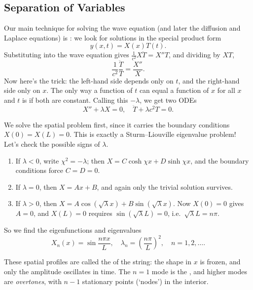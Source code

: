 \documentclass[a4paper]{scrartcl}
\begin{document}
\subsection{Separation of Variables}

Our main technique for solving the wave equation (and later the diffusion and Laplace equations) is : we look for solutions in the special product form
$$
y(x, t) = X(x) T(t).
$$
Substituting into the wave equation gives $\frac{1}{c^2} X \ddot{T} = X'' T$, and dividing by $XT$,
$$
\frac{1}{c^2} \frac{\ddot{T}}{T} = \frac{X''}{X}.
$$
Now here's the trick: the left-hand side depends only on $t$, and the right-hand side only on $x$. The only way a function of $t$ can equal a function of $x$ for all $x$ and $t$ is if both are constant. Calling this  $-\lambda$, we get two ODEs
$$
X'' + \lambda X = 0, \quad \ddot{T} + \lambda c^2 T = 0.
$$

We solve the spatial problem first, since it carries the boundary conditions $X(0) = X(L) = 0$. This is exactly a Sturm--Liouville eigenvalue problem! Let's check the possible signs of $\lambda$.
\begin{enumerate}[label=(\roman*)]
    \item If $\lambda < 0$, write $\chi^2 = -\lambda$; then $X = C \cosh \chi x + D \sinh \chi x$, and the boundary conditions force $C = D = 0$.
    \item If $\lambda = 0$, then $X = Ax + B$, and again only the trivial solution survives.
    \item If $\lambda > 0$, then $X = A \cos(\sqrt{\lambda} x) + B \sin(\sqrt{\lambda}x)$. Now $X(0) = 0$ gives $A = 0$, and $X(L) = 0$ requires $\sin (\sqrt{\lambda} L) = 0$, i.e.\ $\sqrt{\lambda} L = n \pi$.
\end{enumerate}
So we find the eigenfunctions and eigenvalues
$$
X_n(x) = \sin \frac{n \pi x}{L}, \quad \lambda_n = \left(\frac{n \pi}{L}\right)^2, \quad n = 1, 2, \dots.
$$

These spatial profiles are called the  of the string: the shape in $x$ is frozen, and only the amplitude oscillates in time. The $n = 1$ mode is the , and higher modes are \emph{overtones}, with $n - 1$ stationary points (`nodes') in the interior.
\end{document}
